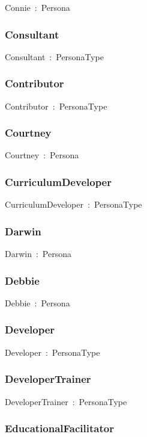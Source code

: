 \documentclass{article}
\begin{document}
Connie~:~Persona

\subsubsection*{Consultant}

Consultant~:~PersonaType

\subsubsection*{Contributor}

Contributor~:~PersonaType

\subsubsection*{Courtney}

Courtney~:~Persona

\subsubsection*{CurriculumDeveloper}

CurriculumDeveloper~:~PersonaType

\subsubsection*{Darwin}

Darwin~:~Persona

\subsubsection*{Debbie}

Debbie~:~Persona

\subsubsection*{Developer}

Developer~:~PersonaType

\subsubsection*{DeveloperTrainer}

DeveloperTrainer~:~PersonaType

\subsubsection*{EducationalFacilitator}
\end{document}
